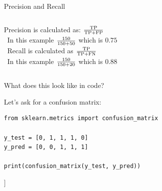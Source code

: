 \documentclass[compress]{beamer}
\begin{document}
\begin{frame}{Precision and Recall} 
	
\begin{columns}
	Precision is calculated as: \(\frac{\rm{TP}}{\rm{TP}+\rm{FP}}\) \\\
	In this example \(\frac{\rm{150}}{\rm{150}+\rm{50}}\) which is \(0.75\) \\\
	Recall is calculated as \(\frac{\rm{TP}}{\rm{TP}+\rm{FN}}\) \\\
	In this example \(\frac{\rm{150}}{\rm{150}+\rm{20}}\) which is \(0.88\)
\end{columns}
\end{frame}


\begin{frame}[fragile]{What does this look like in code?}
	
Let's ask for a confusion matrix: 
\begin{lstlisting}
from sklearn.metrics import confusion_matrix
		
y_test = [0, 1, 1, 1, 0]
y_pred = [0, 0, 1, 1, 1]
		
print(confusion_matrix(y_test, y_pred))
\end{lstlisting}
	
\begin{lstlistingoutput}
[[1  1 ]
[ 1  2]]
\end{lstlistingoutput}
\end{frame}
\end{document}
